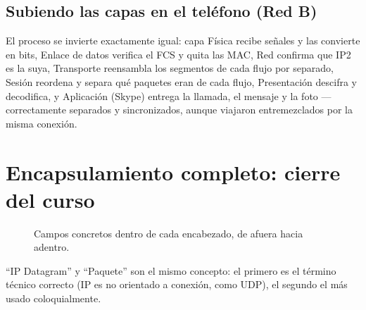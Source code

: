 \documentclass[11pt,a4paper]{article}
\begin{document}
\subsection*{Subiendo las capas en el teléfono (Red B)}
El proceso se invierte exactamente igual: capa Física recibe señales y las convierte en bits, Enlace de datos verifica el FCS y quita las MAC, Red confirma que IP2 es la suya, Transporte reensambla los segmentos de cada flujo por separado, Sesión reordena y separa qué paquetes eran de cada flujo, Presentación descifra y decodifica, y Aplicación (Skype) entrega la llamada, el mensaje y la foto --- correctamente separados y sincronizados, aunque viajaron entremezclados por la misma conexión.

\newpage
\section{Encapsulamiento completo: cierre del curso}

\begin{figure}[h]
\centering
{}
\caption{Campos concretos dentro de cada encabezado, de afuera hacia adentro.}
\end{figure}

\begin{examfact}
``IP Datagram'' y ``Paquete'' son el mismo concepto: el primero es el término técnico correcto (IP es no orientado a conexión, como UDP), el segundo el más usado coloquialmente.
\end{examfact}
\end{document}
